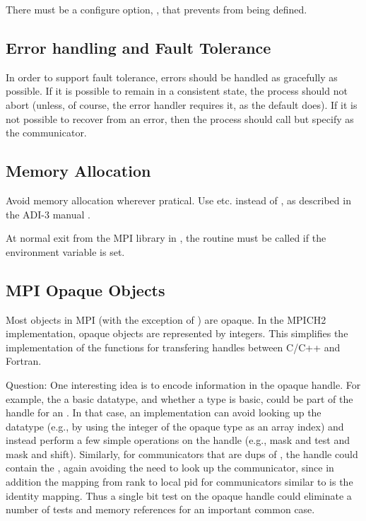 \documentclass{article}
\begin{document}
There must be a configure option, ,
that prevents  from being defined.

\subsection{Error handling and Fault Tolerance}
In order to support fault tolerance, errors should be handled as
gracefully as possible.  If it is possible to remain in a consistent
state, the process should not abort (unless, of course, the error
handler requires it, as the default  does).  
If it is not possible to recover from an error, then the process
should call  but specify  as the
communicator.  

\subsection{Memory Allocation}
Avoid memory allocation wherever pratical.  Use 
etc. instead of , as described in the ADI-3 manual
\cite{adi3man}. 

At normal exit from the MPI library in , the
routine  must be called if the environment variable
 is set.  

\subsection{MPI Opaque Objects}

Most objects in MPI (with the exception of ) are
opaque.  In the MPICH2 implementation, opaque objects are represented
by integers.  This simplifies the implementation of the functions for
transfering handles between C/C++ and Fortran.  

Question:  One interesting idea is to encode information in the opaque
handle.  For example, the  a basic datatype, and whether
a type is basic, could be part of the handle for an
. In that case, an implementation can avoid looking
up the datatype (e.g., by using the integer of the opaque type as an
array index) and instead perform a few simple operations on the handle
(e.g., mask and test and mask and shift).  Similarly, for
communicators that are dups of , the handle could
contain the , again avoiding the need to look up the
communicator, since in addition the mapping from rank to local pid for 
communicators similar to  is the identity
mapping.  Thus a single bit test on the opaque handle could eliminate
a number of tests and memory references for an important common case.
\end{document}
